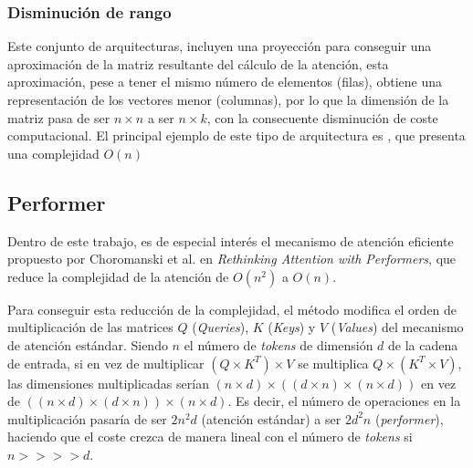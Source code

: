 \subsubsection{Disminución de rango}
Este conjunto de arquitecturas, incluyen una proyección para conseguir una aproximación de la matriz resultante del cálculo de la atención, esta aproximación, pese a tener el mismo número de elementos (filas), obtiene una representación de los vectores menor (columnas), por lo que la dimensión de la matriz pasa de ser $n \times n$ a ser $n \times k$, con la consecuente disminución de coste computacional. El principal ejemplo de este tipo de arquitectura es , \cite{wang2020linformer} que presenta una complejidad $O(n)$



\subsection{Performer}\label{performer}
Dentro de este trabajo, es de especial interés el mecanismo de atención eficiente propuesto por Choromanski et al. en \textit{Rethinking Attention with Performers}\cite{performers}, que reduce la complejidad de la atención de $O(n^2)$ a $O(n)$.

Para conseguir esta reducción de la complejidad, el método modifica el orden de multiplicación de las matrices $Q$ (\textit{Queries}), $K$ (\textit{Keys}) y $V$ (\textit{Values}) del mecanismo de atención estándar. Siendo $n$ el número de \textit{tokens} de dimensión $d$ de la cadena de entrada, si en vez de multiplicar $(Q \times K^T) \times V$ se multiplica $Q \times (K^T \times V)$, las dimensiones multiplicadas serían $(n \times d) \times ((d \times n) \times (n \times d))$ en vez de $((n \times d) \times (d \times n)) \times (n \times d)$. Es decir, el número de operaciones en la multiplicación pasaría de ser $2 n^2 d$ (atención estándar) a ser $2 d^2 n$ (\textit{performer}), haciendo que el coste crezca de manera lineal con el número de \textit{tokens} si $n >>>> d$.

